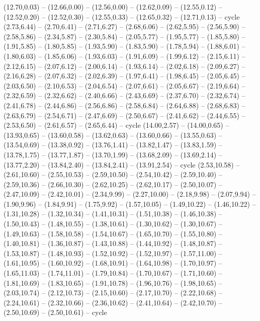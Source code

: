 \expandafter\def\csname geo:gebiet:PSX\endcsname{
  (12.70,0.03) -- (12.66,0.00) -- (12.56,0.00) -- (12.62,0.09) -- (12.55,0.12) -- (12.52,0.20) -- (12.52,0.30) -- (12.55,0.33) -- (12.65,0.32) -- (12.71,0.13) -- cycle}
\expandafter\def\csname geo:gebiet:IRL\endcsname{
  (2.73,6.44) -- (2.70,6.41) -- (2.71,6.27) -- (2.68,6.06) -- (2.62,5.95) -- (2.56,5.90) -- (2.58,5.86) -- (2.34,5.87) -- (2.30,5.84) -- (2.05,5.77) -- (1.95,5.77) -- (1.85,5.80) -- (1.91,5.85) -- (1.80,5.85) -- (1.93,5.90) -- (1.83,5.90) -- (1.78,5.94) -- (1.88,6.01) -- (1.80,6.03) -- (1.85,6.06) -- (1.93,6.03) -- (1.91,6.09) -- (1.99,6.12) -- (2.15,6.11) -- (2.12,6.15) -- (2.07,6.12) -- (2.00,6.14) -- (1.93,6.14) -- (2.02,6.18) -- (2.09,6.27) -- (2.16,6.28) -- (2.07,6.32) -- (2.02,6.39) -- (1.97,6.41) -- (1.98,6.45) -- (2.05,6.45) -- (2.03,6.50) -- (2.10,6.53) -- (2.04,6.54) -- (2.07,6.61) -- (2.05,6.67) -- (2.19,6.64) -- (2.32,6.59) -- (2.32,6.62) -- (2.40,6.66) -- (2.43,6.69) -- (2.37,6.70) -- (2.32,6.74) -- (2.41,6.78) -- (2.44,6.86) -- (2.56,6.86) -- (2.58,6.84) -- (2.64,6.88) -- (2.68,6.83) -- (2.63,6.79) -- (2.54,6.71) -- (2.47,6.69) -- (2.50,6.67) -- (2.41,6.62) -- (2.44,6.55) -- (2.53,6.50) -- (2.61,6.57) -- (2.65,6.44) -- cycle}
\expandafter\def\csname geo:gebiet:IRQ\endcsname{
  (14.00,2.57) -- (14.00,0.65) -- (13.93,0.65) -- (13.60,0.58) -- (13.62,0.63) -- (13.60,0.66) -- (13.55,0.63) -- (13.54,0.69) -- (13.38,0.92) -- (13.76,1.41) -- (13.82,1.47) -- (13.83,1.59) -- (13.78,1.75) -- (13.77,1.87) -- (13.70,1.99) -- (13.68,2.09) -- (13.69,2.14) -- (13.77,2.20) -- (13.84,2.40) -- (13.84,2.41) -- (13.91,2.54) -- cycle}
\expandafter\def\csname geo:gebiet:IRN\endcsname{
  }
\expandafter\def\csname geo:gebiet:ISL\endcsname{
  (2.53,10.58) -- (2.61,10.60) -- (2.55,10.53) -- (2.59,10.50) -- (2.54,10.42) -- (2.59,10.40) -- (2.59,10.36) -- (2.66,10.30) -- (2.62,10.25) -- (2.62,10.17) -- (2.50,10.07) -- (2.47,10.09) -- (2.42,10.01) -- (2.34,9.99) -- (2.27,10.00) -- (2.18,9.98) -- (2.07,9.94) -- (1.90,9.96) -- (1.84,9.91) -- (1.75,9.92) -- (1.57,10.05) -- (1.49,10.22) -- (1.46,10.22) -- (1.31,10.28) -- (1.32,10.34) -- (1.41,10.31) -- (1.51,10.38) -- (1.46,10.38) -- (1.50,10.43) -- (1.48,10.55) -- (1.38,10.61) -- (1.30,10.62) -- (1.30,10.67) -- (1.49,10.63) -- (1.58,10.58) -- (1.54,10.67) -- (1.65,10.70) -- (1.55,10.80) -- (1.40,10.81) -- (1.36,10.87) -- (1.43,10.88) -- (1.44,10.92) -- (1.48,10.87) -- (1.53,10.87) -- (1.48,10.93) -- (1.52,10.92) -- (1.52,10.97) -- (1.57,11.00) -- (1.61,10.95) -- (1.60,10.92) -- (1.68,10.91) -- (1.64,10.98) -- (1.70,10.97) -- (1.65,11.03) -- (1.74,11.01) -- (1.79,10.84) -- (1.70,10.67) -- (1.71,10.60) -- (1.81,10.69) -- (1.83,10.65) -- (1.91,10.78) -- (1.96,10.76) -- (1.98,10.65) -- (2.03,10.74) -- (2.12,10.73) -- (2.15,10.60) -- (2.17,10.70) -- (2.22,10.68) -- (2.24,10.61) -- (2.32,10.66) -- (2.36,10.62) -- (2.41,10.64) -- (2.42,10.70) -- (2.50,10.69) -- (2.50,10.61) -- cycle}
